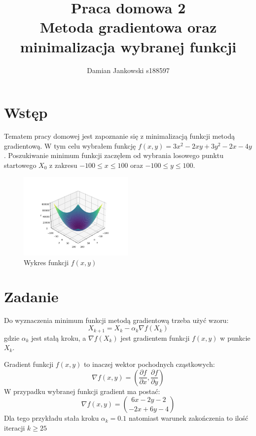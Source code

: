 \documentclass{article}
\title{Praca domowa 2\\Metoda gradientowa oraz\\
minimalizacja wybranej funkcji}
\author{Damian Jankowski s188597}
\begin{document}
\maketitle

\section{Wstęp}
Tematem pracy domowej jest zapoznanie się z minimalizacją funkcji
metodą gradientową. W tym celu wybrałem funkcję
$f(x, y) = 3x^2-2xy+3y^2-2x-4y$. Poszukiwanie minimum funkcji
zaczęłem od wybrania losowego punktu startowego $X_0$ z zakresu
$-100 \le x \le 100$ oraz $-100 \le y \le 100$.

\begin{figure}[H]
    \centering
    \includegraphics[width=0.5\textwidth]{function.png}
    \caption{Wykres funkcji $f(x, y)$}
\end{figure}


\section{Zadanie}
Do wyznaczenia minimum funkcji metodą gradientową trzeba użyć
wzoru:
\begin{equation}
X_{k+1} = X_k - \alpha_k \nabla f(X_k)
\end{equation}
gdzie $\alpha_k$ jest stałą kroku, 
a $\nabla f(X_k)$ jest gradientem
funkcji $f(x, y)$ w punkcie $X_k$.

Gradient funkcji $f(x, y)$ to inaczej wektor pochodnych
cząstkowych:
\begin{equation}
\nabla f(x, y) = \left( \frac{\partial f}{\partial x}, \frac{\partial f}{\partial y} \right)
\end{equation}
W przypadku wybranej funkcji gradient ma postać:
\begin{equation}
\nabla f(x, y) = {6x-2y-2 \choose -2x+6y-4}
\end{equation}
Dla tego przykładu stała kroku $\alpha_k = 0.1$ natomiast
warunek zakończenia to ilość iteracji $k \ge 25$
\end{document}
